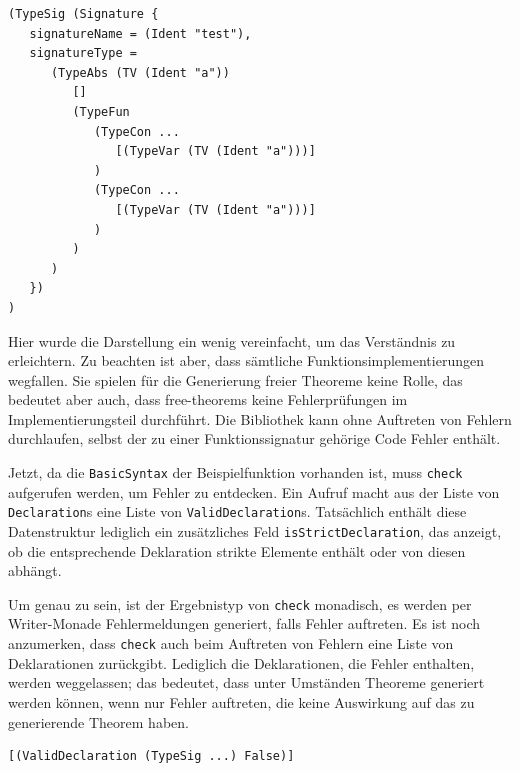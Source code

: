
\begin{verbatim}
(TypeSig (Signature {
   signatureName = (Ident "test"),
   signatureType =
      (TypeAbs (TV (Ident "a"))
         []
         (TypeFun
            (TypeCon ...
               [(TypeVar (TV (Ident "a")))]
            )
            (TypeCon ...
               [(TypeVar (TV (Ident "a")))]
            )
         )
      )
   })
)
\end{verbatim}

Hier wurde die Darstellung ein wenig vereinfacht, um das Verständnis zu erleichtern. Zu beachten ist aber, dass sämtliche
Funktionsimplementierungen wegfallen. Sie spielen für die Generierung freier Theoreme keine Rolle, das bedeutet aber auch,
dass free-theorems keine Fehlerprüfungen im Implementierungsteil durchführt. Die Bibliothek kann ohne Auftreten von Fehlern
durchlaufen, selbst der zu einer Funktionssignatur gehörige Code Fehler enthält.

Jetzt, da die \texttt{BasicSyntax} der Beispielfunktion vorhanden ist, muss \texttt{check} aufgerufen werden, um Fehler
zu entdecken. Ein Aufruf macht aus der Liste von \texttt{Declaration}s eine Liste von \texttt{ValidDeclaration}s. Tatsächlich
enthält diese Datenstruktur lediglich ein zusätzliches Feld \texttt{isStrictDeclaration}, das anzeigt, ob die entsprechende
Deklaration strikte Elemente enthält oder von diesen abhängt.

Um genau zu sein, ist der Ergebnistyp von \texttt{check} monadisch, es werden per Writer-Monade Fehlermeldungen
generiert, falls Fehler auftreten. Es ist noch anzumerken, dass \texttt{check} auch beim Auftreten von Fehlern eine Liste
von Deklarationen zurückgibt. Lediglich die Deklarationen, die Fehler enthalten, werden weggelassen; das bedeutet, dass
unter Umständen Theoreme generiert werden können, wenn nur Fehler auftreten, die keine Auswirkung auf das zu generierende
Theorem haben.

\begin{verbatim}
[(ValidDeclaration (TypeSig ...) False)]
\end{verbatim}

